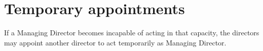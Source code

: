 \section{Temporary appointments}

If a Managing Director becomes incapable of acting in that capacity, the directors may appoint another director to act temporarily as Managing Director. 
